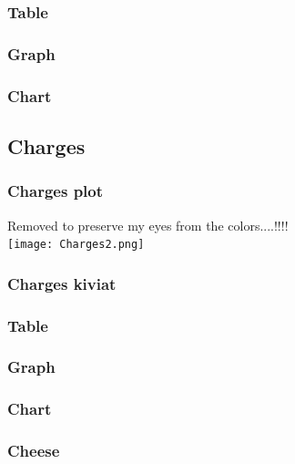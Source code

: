 \documentclass[8pt]{article} %
\begin{document}
\subsubsection{Table}

\subsubsection{Graph}

\subsubsection{Chart}


\subsection{Charges}


\subsubsection{Charges plot}
Removed to preserve my eyes from the colors....!!!!\\
\texttt{[image: Charges2.png]}

\subsubsection{Charges kiviat}


\subsubsection{Table}


\subsubsection{Graph}


\subsubsection{Chart}

\subsubsection{Cheese}


\end{document}
